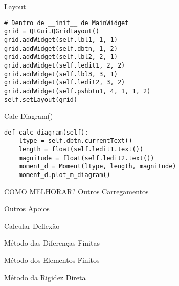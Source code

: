\documentclass[presentation]{beamer}
\begin{document}
\begin{frame}[fragile,label={sec:orgheadline26}]{Layout}
 \begin{verbatim}
# Dentro de __init__ de MainWidget
grid = QtGui.QGridLayout()      
grid.addWidget(self.lbl1, 1, 1)    
grid.addWidget(self.dbtn, 1, 2)     
grid.addWidget(self.lbl2, 2, 1)                                      
grid.addWidget(self.ledit1, 2, 2)                             
grid.addWidget(self.lbl3, 3, 1)                                    
grid.addWidget(self.ledit2, 3, 2)                                    
grid.addWidget(self.pshbtn1, 4, 1, 1, 2)                  
self.setLayout(grid)
\end{verbatim}
\end{frame}
\begin{frame}[fragile,label={sec:orgheadline27}]{Calc Diagram()}
 \begin{verbatim}
def calc_diagram(self):
    ltype = self.dbtn.currentText()       
    length = float(self.ledit1.text())   
    magnitude = float(self.ledit2.text())   
    moment_d = Moment(ltype, length, magnitude)
    moment_d.plot_m_diagram()
\end{verbatim}
\end{frame}
\begin{frame}[label={sec:orgheadline28}]{COMO MELHORAR?}
Outros Carregamentos

Outros Apoios

Calcular Deflexão

Método das Diferenças Finitas

Método dos Elementos Finitos

Método da Rigidez Direta
\end{frame}
\end{document}
